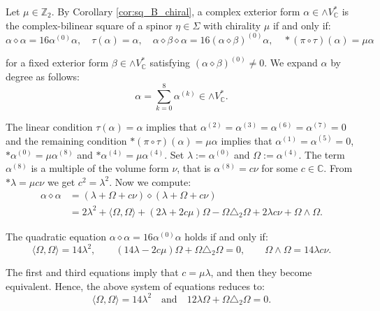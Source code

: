 \documentclass[10pt,a4paper,twoside,reqno]{amsart}
\theoremstyle{plain}
\theoremstyle{definition}
\theoremstyle{remark}
\def\C{\mathbb{C}}
\newcommand{\escal}[1]{\langle#1\rangle}
\begin{document}

Let $\mu\in\mathbb{Z}_2$. By Corollary \ref{cor:sq_B_chiral}, a complex exterior form $\alpha\in\wedge V^*_\C$ is the complex-bilinear square of a spinor $\eta\in\Sigma$ with chirality $\mu$ if and only if:
\begin{equation*}
\alpha\diamond\alpha=16\alpha^{(0)}\alpha,\quad\tau(\alpha)=\alpha,\quad\alpha\diamond\beta\diamond\alpha=16(\alpha\diamond\beta)^{(0)}\alpha,\quad *(\pi\circ\tau)(\alpha)=\mu\alpha
\end{equation*}

\noindent
for a fixed exterior form $\beta\in\wedge V^*_\C$ satisfying $(\alpha\diamond\beta)^{(0)}\neq0$. We expand $\alpha$ by degree as follows:
\begin{equation*}
\alpha=\sum_{k=0}^8\alpha^{(k)}\in\wedge V^*_\C.
\end{equation*}

\noindent
The linear condition $\tau(\alpha)=\alpha$ implies that $\alpha^{(2)} = \alpha^{(3)} = \alpha^{(6)} = \alpha^{(7)} = 0$ and the remaining condition $*(\pi\circ\tau)(\alpha)=\mu\alpha$ implies that $\alpha^{(1)}=\alpha^{(5)}=0$, $*\alpha^{(0)}=\mu\alpha^{(8)}$ and $*\alpha^{(4)}=\mu\alpha^{(4)}$. Set $\lambda := \alpha^{(0)}$ and $\Omega:=\alpha^{(4)}$. The term $\alpha^{(8)}$ is a multiple of the volume form $\nu$, that is $\alpha^{(8)}=c\nu$ for some $c\in\C$. From $*\lambda=\mu c\nu$ we get $c^2=\lambda^2$. Now we compute:
\begin{align*}
\alpha\diamond\alpha&=(\lambda + \Omega+c\nu)\diamond(\lambda + \Omega + c\nu)\\
&=2\lambda^2+\escal{\Omega,\Omega}+(2\lambda+2c\mu)\Omega-\Omega\triangle_2\Omega+2 \lambda c\nu+\Omega\wedge\Omega.
\end{align*}

\noindent
The quadratic equation $\alpha\diamond\alpha=16\alpha^{(0)}\alpha$ holds if and only if:
\begin{equation*}
\escal{\Omega,\Omega}=14\lambda^2,\qquad(14\lambda - 2c\mu)\Omega+\Omega\triangle_2\Omega=0,\qquad\Omega\wedge\Omega=14 \lambda c\nu.   
\end{equation*}

\noindent
The first and third equations imply that $c=\mu \lambda$, and then they become equivalent. Hence, the above system of equations reduces to: 
\begin{equation}
\label{eq:Spin(7)_type_equation}
\escal{\Omega,\Omega}=14\lambda^2\quad\text{and}\quad 12\lambda\Omega+\Omega\triangle_2\Omega=0.
\end{equation}
\end{document}
